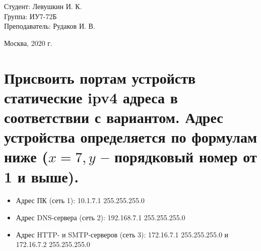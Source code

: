 \documentclass[a4paper,12pt]{article}
\begin{document}
	\large
	\begin{flushright}
		Студент: Левушкин И. К. \\
		Группа: ИУ7-72Б \\
		Преподаватель: Рудаков И. В. \\
	\end{flushright}
	
	\vspace*{25mm}
	\begin{center}
		Москва, 2020 г.  
	\end{center}
	\thispagestyle{empty}
	
	
	\newpage
	
	\section{Присвоить портам устройств статические ipv4 адреса в соответствии с вариантом. Адрес устройства определяется по формулам ниже ($x = 7,  y$ – порядковый номер от 1 и выше).}
	
	\begin{itemize}
		\item Адрес ПК (сеть 1): 10.1.7.1 255.255.255.0
		\item Адрес DNS-сервера (сеть 2): 192.168.7.1 255.255.255.0
		\item Адрес HTTP- и SMTP-серверов (сеть 3): 172.16.7.1 255.255.255.0 и 172.16.7.2 255.255.255.0
	\end{itemize}
\end{document}
